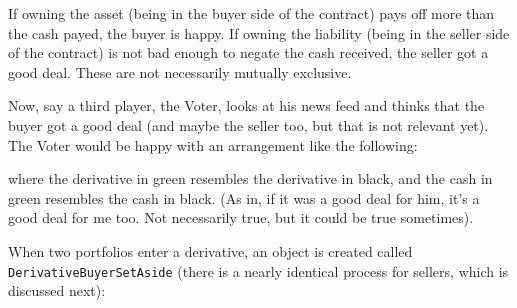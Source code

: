 \documentclass[a4]{article}
\begin{document}
If owning the asset (being in the buyer side of the contract) pays off more
than the cash payed, the buyer is happy. If owning the liability (being in the
seller side of the contract) is not bad enough to negate the cash received, the
seller got a good deal. These are not necessarily mutually exclusive.

Now, say a third player, the Voter, looks at his news feed and thinks that the
buyer got a good deal (and maybe the seller too, but that is not relevant yet).
The Voter would be happy with an arrangement like the following:
\begin{figure}
\noindent{}
\end{figure}

where the derivative in green resembles the derivative in black, and the cash
in green resembles the cash in black. (As in, if it was a good deal for him,
it's a good deal for me too. Not necessarily true, but it could be true
sometimes).

When two portfolios enter a derivative, an object is created called
\texttt{DerivativeBuyerSetAside} (there is a nearly identical process for sellers,
which is discussed next):
\begin{figure}
\noindent{}
\end{figure}
\end{document}
